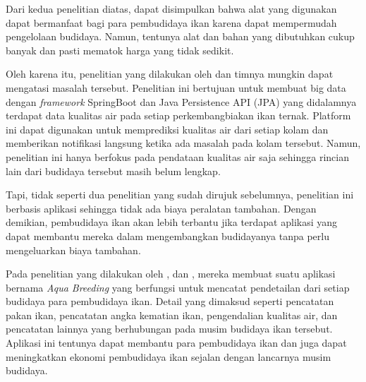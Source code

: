 Dari kedua penelitian diatas, dapat disimpulkan bahwa alat yang digunakan dapat bermanfaat bagi para pembudidaya ikan karena dapat mempermudah pengelolaan budidaya. Namun, tentunya alat dan bahan yang dibutuhkan cukup banyak dan pasti mematok harga yang tidak sedikit. 

Oleh karena itu, penelitian yang dilakukan oleh \citep{waterquality} dan timnya mungkin dapat mengatasi masalah tersebut. Penelitian ini bertujuan untuk membuat big data dengan \textit{framework} SpringBoot dan Java Persistence API (JPA) yang didalamnya terdapat data kualitas air pada setiap perkembangbiakan ikan ternak. Platform ini dapat digunakan untuk memprediksi kualitas air dari setiap kolam dan memberikan notifikasi langsung ketika ada masalah pada kolam tersebut. Namun, penelitian ini hanya berfokus pada pendataan kualitas air saja sehingga rincian lain dari budidaya tersebut masih belum lengkap. \citep{waterquality} 

Tapi, tidak seperti dua penelitian yang sudah dirujuk sebelumnya, penelitian \citep{waterquality} ini berbasis aplikasi sehingga tidak ada biaya peralatan tambahan. Dengan demikian, pembudidaya ikan akan lebih terbantu jika terdapat aplikasi yang dapat membantu mereka dalam mengembangkan budidayanya tanpa perlu mengeluarkan biaya tambahan.

Pada penelitian yang dilakukan oleh \citep{fadhil2021}, \citep{gian2022} dan \citep{andri2022}, mereka membuat suatu aplikasi bernama \textit{Aqua Breeding} yang berfungsi untuk mencatat pendetailan dari setiap budidaya para pembudidaya ikan. Detail yang dimaksud seperti pencatatan pakan ikan, pencatatan angka kematian ikan, pengendalian kualitas air, dan pencatatan lainnya yang berhubungan pada musim budidaya ikan tersebut. Aplikasi ini tentunya dapat membantu para pembudidaya ikan dan juga dapat meningkatkan ekonomi pembudidaya ikan sejalan dengan lancarnya musim budidaya.

